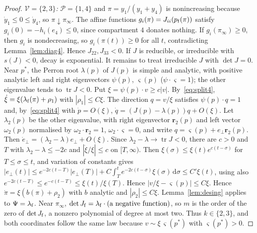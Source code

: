 \documentclass[11pt,a4paper]{article}
\theoremstyle{definition}\newtheorem{definition}[theorem]{Definition}
\theoremstyle{remark}\newtheorem{remark}[theorem]{Remark}
\newcommand{\dd}{\,\mathrm d}
\newcommand{\Vs}{\mathcal V}
\newcommand{\Ps}{\mathcal P}
\begin{document}
\begin{proof}
\emph{$\Vs=\{2,3\}$:} $\Ps=\{1,4\}$ and $\pi=y_1/(y_1+y_4)$ is
nonincreasing because $\dot y_1\le0\le\dot y_4$, so $\pi\downarrow\pi_\infty$.
The affine functions $g_i(\pi)=J_{ii}(p_{\rm f}(\pi))$ satisfy
$g_i(0)=-h_i(e_4)\le0$, since compartment $4$ donates nothing. If
$g_i(\pi_\infty)\ge0$, then $g_i$ is nondecreasing, so $g_i(\pi(t))\ge0$ for
all $t$, contradicting Lemma~\ref{lem:diag4}. Hence $J_{22},J_{33}<0$. If
$J$ is reducible, or irreducible with $s(J)<0$, decay is exponential. It
remains to treat irreducible $J$ with $\det J=0$. Near $p^*$, the Perron
root $\lambda(p)$ of $J(p)$ is simple and analytic, with positive analytic
left and right eigenvectors $\psi(p)$, $\varsigma(p)$ ($\psi\cdot\varsigma=1$);
the other eigenvalue tends to $\operatorname{tr}J<0$. Put
$\xi=\psi(p)\cdot v\ge c|v|$. By~\eqref{eq:split4},
$\dot\xi=\xi(\lambda_{\rm f}(\pi)+\rho_1)$ with $|\rho_1|\le C\xi$. The
direction $q=v/\xi$ satisfies $\psi(p)\cdot q=1$ and, by~\eqref{eq:split4}
with $\dot p=O(\xi)$, $\dot q=(J(p)-\lambda(p))q+O(\xi)$. Let $\lambda_2(p)$ be
the other eigenvalue, with right eigenvector $\mathbf r_2(p)$ and left
vector $\omega_2(p)$ normalised by $\omega_2\cdot\mathbf r_2=1$,
$\omega_2\cdot\varsigma=0$, and write $q=\varsigma(p)+e_\perp\mathbf r_2(p)$.
Then $\dot e_\perp=(\lambda_2-\lambda)e_\perp+O(\xi)$. Since
$\lambda_2-\lambda\to\operatorname{tr}J<0$, there are $c>0$ and $T$ with
$\lambda_2-\lambda\le-2c$ and $|\dot\xi/\xi|\le c$ on $[T,\infty)$. Then
$\xi(\sigma)\le\xi(t)e^{c(t-\sigma)}$ for $T\le\sigma\le t$, and variation of
constants gives
$|e_\perp(t)|\le e^{-2c(t-T)}|e_\perp(T)|+C\int_T^te^{-2c(t-\sigma)}\xi(\sigma)\dd\sigma
\le C'\xi(t)$, using also $e^{-2c(t-T)}\le e^{-c(t-T)}\le\xi(t)/\xi(T)$.
Hence $|v/\xi-\varsigma(p)|\le C\xi$.
Hence $\dot\pi=\xi(b(\pi)+\rho_2)$ with $b$ analytic and $|\rho_2|\le C\xi$.
Lemma~\ref{lem:desing} applies to $\Psi=\lambda_{\rm f}$. Near $\pi_\infty$,
$\det J_{\rm f}=\lambda_{\rm f}\cdot(\text{a negative function})$, so $m$ is the
order of the zero of $\det J_{\rm f}$, a nonzero polynomial of degree at
most two. Thus $k\in\{2,3\}$, and both coordinates follow the same law
because $v\sim\xi\,\varsigma(p^*)$ with $\varsigma(p^*)>0$.
\end{proof}
\end{document}
